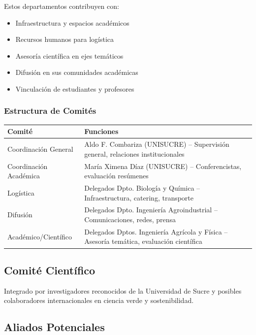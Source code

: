 \documentclass[12pt,a4paper]{article}
\begin{document}
Estos departamentos contribuyen con:
\begin{itemize}[label={\textcolor{verdemid}{\textbullet}}]
  \item Infraestructura y espacios académicos
  \item Recursos humanos para logística
  \item Asesoría científica en ejes temáticos
  \item Difusión en sus comunidades académicas
  \item Vinculación de estudiantes y profesores
\end{itemize}

\subsubsection{Estructura de Comités}

\begin{table}[H]
\centering
\small
\begin{tabular}{|l|p{10cm}|}
\hline
\rowcolor{verdeclaro}
\textbf{Comité} & \textbf{Funciones} \\
\hline
Coordinación General & Aldo F. Combariza (UNISUCRE) -- Supervisión general, relaciones institucionales \\
\hline
Coordinación Académica & María Ximena Díaz (UNISUCRE) -- Conferencistas, evaluación resúmenes \\
\hline
Logística & Delegados Dpto. Biología y Química -- Infraestructura, catering, transporte \\
\hline
Difusión & Delegados Dpto. Ingeniería Agroindustrial -- Comunicaciones, redes, prensa \\
\hline
Académico/Científico & Delegados Dptos. Ingeniería Agrícola y Física -- Asesoría temática, evaluación científica \\
\hline
\end{tabular}
\end{table}

\subsection{Comité Científico}

Integrado por investigadores reconocidos de la Universidad de Sucre y posibles colaboradores internacionales en ciencia verde y sostenibilidad.

\subsection{Aliados Potenciales}
\end{document}
